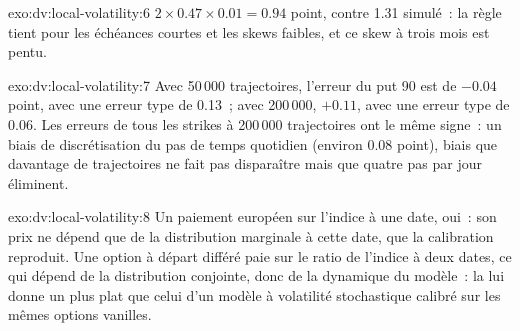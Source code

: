 \begin{solution}{exo:dv:local-volatility:6}
$2\times0.47\times0.01=0.94$ point, contre 1.31 simulé~: la règle tient pour les échéances courtes et les skews faibles, et
ce skew à trois mois est pentu.
\end{solution}

\begin{solution}{exo:dv:local-volatility:7}
Avec 50\,000 trajectoires, l'erreur du put 90 est de $-0.04$ point, avec une erreur type de 0.13~; avec 200\,000, $+0.11$, avec une
erreur type de 0.06. Les erreurs de tous les strikes à 200\,000 trajectoires ont le même signe~: un biais de discrétisation du
pas de temps quotidien (environ 0.08 point), biais que davantage de trajectoires ne fait pas disparaître mais que quatre pas par jour éliminent.
\end{solution}

\begin{solution}{exo:dv:local-volatility:8}
Un paiement européen sur l'indice à une date, oui~: son prix ne dépend que de la distribution marginale à cette date,
que la calibration reproduit. Une option à départ différé paie sur le ratio de l'indice à deux dates, ce qui dépend de la
distribution conjointe, donc de la dynamique du modèle~: la  lui donne un  plus plat que
celui d'un modèle à volatilité stochastique calibré sur les mêmes options vanilles.
\end{solution}

